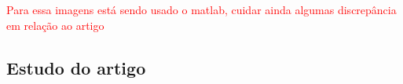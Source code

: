 \textcolor{red}{Para essa imagens está sendo usado o matlab, cuidar ainda algumas discrepância em relação ao artigo}



\subsection{Estudo do artigo  \cite{nhfc}}

